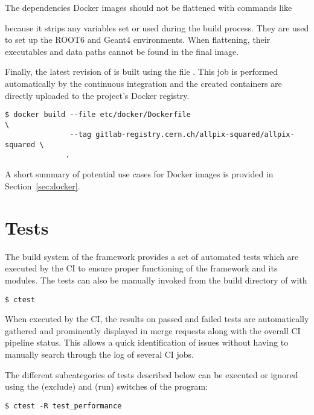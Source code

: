 \begin{warning}
  The dependencies Docker images should not be flattened with commands like


  because it strips any  variables set or used during the build process. They are used to set up the ROOT6 and Geant4 environments. When flattening, their executables and data paths cannot be found in the final \apsq image.
\end{warning}

Finally, the latest revision of \apsq is built using the file .
This job is performed automatically by the continuous integration and the created containers are directly uploaded to the project's Docker registry.
\begin{verbatim}
$ docker build --file etc/docker/Dockerfile                                \
               --tag gitlab-registry.cern.ch/allpix-squared/allpix-squared \
              .
\end{verbatim}

A short summary of potential use cases for Docker images is provided in Section~\ref{sec:docker}.

\section{Tests}
\label{sec:tests}

The build system of the framework provides a set of automated tests which are executed by the CI to ensure proper functioning of the framework and its modules.
The tests can also be manually invoked from the build directory of \apsq with
\begin{verbatim}
$ ctest
\end{verbatim}
When executed by the CI, the results on passed and failed tests are automatically gathered and prominently displayed in merge requests along with the overall CI pipeline status.
This allows a quick identification of issues without having to manually search through the log of several CI jobs.

The different subcategories of tests described below can be executed or ignored using the \command{-E} (exclude) and  (run) switches of the  program:
\begin{verbatim}
$ ctest -R test_performance
\end{verbatim}

